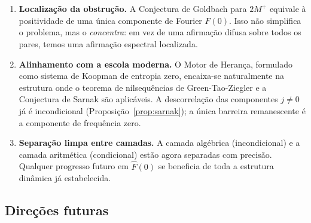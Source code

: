 \documentclass[12pt,a4paper]{article}
\theoremstyle{definition}
\begin{document}
	\begin{enumerate}
		\item \textbf{Localização da obstrução.} A Conjectura de Goldbach para
		$2M^+$ equivale à positividade de uma única componente de Fourier
		$\widehat{F}(0)$. Isso não simplifica o problema, mas o
		\emph{concentra}: em vez de uma afirmação difusa sobre todos os pares,
		temos uma afirmação espectral localizada.
		
		\item \textbf{Alinhamento com a escola moderna.} O Motor de Herança,
		formulado como sistema de Koopman de entropia zero, encaixa-se
		naturalmente na estrutura onde o teorema de nilsequências de
		Green-Tao-Ziegler e a Conjectura de Sarnak são aplicáveis.
		A descorrelação das componentes $j \neq 0$ já é incondicional
		(Proposição~\ref{prop:sarnak}); a única barreira remanescente
		é a componente de frequência zero.
		
		\item \textbf{Separação limpa entre camadas.} A camada algébrica
		(incondicional) e a camada aritmética (condicional) estão agora
		separadas com precisão. Qualquer progresso futuro em $\widehat{F}(0)$
		se beneficia de toda a estrutura dinâmica já estabelecida.
	\end{enumerate}
	
	\subsection{Direções futuras}
	
\end{document}
